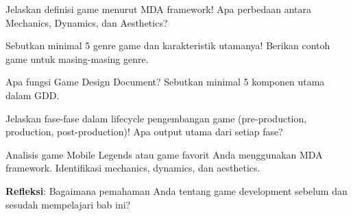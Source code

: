 \documentclass[../main]{subfiles}
\begin{document}
\begin{latihan}
  \item Jelaskan definisi game menurut MDA framework! Apa perbedaan antara Mechanics, Dynamics, dan Aesthetics?
  
  \item Sebutkan minimal 5 genre game dan karakteristik utamanya! Berikan contoh game untuk masing-masing genre.
  
  \item Apa fungsi Game Design Document? Sebutkan minimal 5 komponen utama dalam GDD.
  
  \item Jelaskan fase-fase dalam lifecycle pengembangan game (pre-production, production, post-production)! Apa output utama dari setiap fase?
  
  \item Analisis game Mobile Legends atau game favorit Anda menggunakan MDA framework. Identifikasi mechanics, dynamics, dan aesthetics.
  
  \item \textbf{Refleksi}: Bagaimana pemahaman Anda tentang game development sebelum dan sesudah mempelajari bab ini?
\end{latihan}

\end{document}
